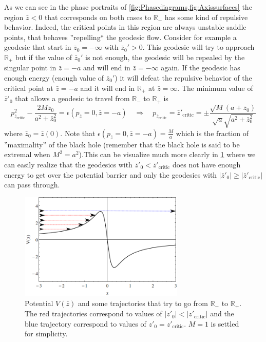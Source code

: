As we can see in the phase portraits of \cref{fig:Phasediagrams,fig:Axissurfaces} the region $\bar z <0$ that corresponds on both cases to $\mathbb{R}_-$ has some kind of repulsive behavior. Indeed, the critical points in this region are always unstable saddle points, that behaves ''repelling`` the geodesic flow. Consider for example a geodesic that start in $\bar z_0 = -\infty$ with $\bar z_0'>0$. This geodesic will try to approach $\mathbb{R}_+$ but if the value of $\bar z_0'$ is not enough, the geodesic will be repealed by the singular point in $\bar z=-a$ and will end in $\bar z =-\infty$ again. If the geodesic has enough energy (enough value of $\bar z_0'$) it will defeat the repulsive behavior of the critical point at $\bar z=-a$  and it will end in $\mathbb{R}_+$ at $\bar z=\infty$. The minimum value of $\bar z'_0$ that allows a geodesic to travel from $\mathbb{R}_-$ to $\mathbb{R}_+$ is
\begin{equation}
 p_{\bar{z}_\text{critic}}^2-\frac{2 M \bar z_0}{a^2+\bar z_0^2}=\epsilon(p_{\bar{z}}=0,\bar{z}=-a) \quad \Longrightarrow \quad p_{\bar{z}_\text{critic}} =\bar z'_\text{critic}=\pm \frac{\sqrt{M} (a+\bar z_0)}{\sqrt{a} \sqrt{a^2+\bar{z}_0^2}}
\end{equation}
where $\bar{z}_0=\bar{z}(0)$. Note that $\epsilon(p_{\bar{z}}=0,\bar{z}=-a)=\frac{M}{a} $ which is the fraction of ''maximality'' of the black hole (remember that the black hole is said to be extremal when $M^2=a^2$).This can be visualize much more clearly in \cref{fig:zcritic} where we can easily realize that the geodesics with $\bar{z}'_0<\bar{z}'_\text{critic}$ does not have enough energy to get over the potential barrier and only the geodesies with $|\bar{z}'_0| \geq |\bar{z}'_\text{critic}|$ can pass through.
 \begin{figure}[hpt!] 
\begin{center}
 \centerline{\includegraphics[width=0.7\textwidth]{img/Chapter3/Return.png}}
 \end{center}
 \caption{Potential $V(\bar z)$ and some trajectories that try to go from $\mathbb{R_-}$ to $\mathbb{R_+}$. The red trajectories correspond to values of $|z'_0|<|z'_\text{critic}|$ and the blue trajectory correspond to values of $z'_0=z'_\text{critic}$. $M=1$ is settled for simplicity.}
 \label{fig:zcritic}
\end{figure}  
